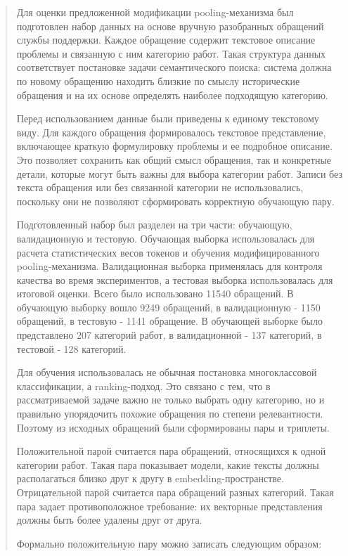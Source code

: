 \begin{quote}
Для оценки предложенной модификации pooling-механизма был подготовлен
набор данных на основе вручную разобранных обращений службы поддержки.
Каждое обращение содержит текстовое описание проблемы и связанную с ним
категорию работ. Такая структура данных соответствует постановке задачи
семантического поиска: система должна по новому обращению находить
близкие по смыслу исторические обращения и на их основе определять
наиболее подходящую категорию.

Перед использованием данные были приведены к единому текстовому виду.
Для каждого обращения формировалось текстовое представление, включающее
краткую формулировку проблемы и ее подробное описание. Это позволяет
сохранить как общий смысл обращения, так и конкретные детали, которые
могут быть важны для выбора категории работ. Записи без текста обращения
или без связанной категории не использовались, поскольку они не
позволяют сформировать корректную обучающую пару.

Подготовленный набор был разделен на три части: обучающую, валидационную
и тестовую. Обучающая выборка использовалась для расчета статистических
весов токенов и обучения модифицированного pooling-механизма.
Валидационная выборка применялась для контроля качества во время
экспериментов, а тестовая выборка использовалась для итоговой оценки.
Всего было использовано 11540 обращений. В обучающую выборку вошло 9249
обращений, в валидационную - 1150 обращений, в тестовую - 1141
обращение. В обучающей выборке было представлено 207 категорий работ, в
валидационной - 137 категорий, в тестовой - 128 категорий.

Для обучения использовалась не обычная постановка многоклассовой
классификации, а ranking-подход. Это связано с тем, что в
рассматриваемой задаче важно не только выбрать одну категорию, но и
правильно упорядочить похожие обращения по степени релевантности.
Поэтому из исходных обращений были сформированы пары и триплеты.

Положительной парой считается пара обращений, относящихся к одной
категории работ. Такая пара показывает модели, какие тексты должны
располагаться близко друг к другу в embedding-пространстве.
Отрицательной парой считается пара обращений разных категорий. Такая
пара задает противоположное требование: их векторные представления
должны быть более удалены друг от друга.

Формально положительную пару можно записать следующим образом:
\end{quote}


